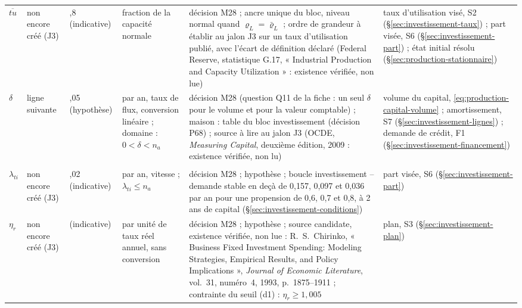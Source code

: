 \documentclass[11pt,a4paper]{article}
\newcommand{\code}[1]{\texttt{\detokenize{#1}}}
\begin{document}
\begin{center}
\begin{longtable}{p{1.5cm}>{\raggedright\arraybackslash}p{3.0cm}>{\raggedright\arraybackslash}p{1.4cm}>{\raggedright\arraybackslash}p{1.8cm}>{\raggedright\arraybackslash}p{3.4cm}>{\raggedright\arraybackslash}p{2.6cm}}
$\overline{\mathit{tu}}$ & non encore créé (J3) & 0,8 (indicative) & fraction de la capacité normale & décision M28 ; ancre unique du bloc, niveau normal quand $\varrho_L = \bar\varrho_L$ ; ordre de grandeur à établir au jalon J3 sur un taux d'utilisation publié, avec l'écart de définition déclaré (Federal Reserve, statistique G.17, « Industrial Production and Capacity Utilization » : existence vérifiée, non lue) & taux d'utilisation visé, S2 (\S\ref{sec:investissement-taux}) ; part visée, S6 (\S\ref{sec:investissement-part}) ; état initial résolu (\S\ref{sec:production-stationnaire})\\
$\delta$ & ligne suivante & 0,05 (hypothèse) & par an, taux de flux, conversion linéaire ; domaine : $0 < \delta < n_a$ & décision M28 (question Q11 de la fiche : un seul $\delta$ pour le volume et pour la valeur comptable) ; maison : table du bloc investissement (décision P68) ; source à lire au jalon J3 (OCDE, \emph{Measuring Capital}, deuxième édition, 2009 : existence vérifiée, non lu) & volume du capital, \eqref{eq:production-capital-volume} ; amortissement, S7 (\S\ref{sec:investissement-lignes}) ; demande de crédit, F1 (\S\ref{sec:investissement-financement})\\
\multicolumn{6}{l}{\quad \code{nations.moteur.parametres.investissement.DELTA}}\\
$\lambda_{\mathit{ti}}$ & non encore créé (J3) & 0,02 (indicative) & par an, vitesse ; $\lambda_{\mathit{ti}} \le n_a$ & décision M28 ; hypothèse ; boucle investissement -- demande stable en deçà de 0,157, 0,097 et 0,036 par an pour une propension de 0,6, 0,7 et 0,8, à 2 ans de capital (\S\ref{sec:investissement-conditions}) & part visée, S6 (\S\ref{sec:investissement-part})\\
$\eta_r$ & non encore créé (J3) & 2 (indicative) & par unité de taux réel annuel, sans conversion & décision M28 ; hypothèse ; source candidate, existence vérifiée, non lue : R.~S.~Chirinko, « Business Fixed Investment Spending: Modeling Strategies, Empirical Results, and Policy Implications », \emph{Journal of Economic Literature}, vol.~31, numéro~4, 1993, p.~1875--1911 ; contrainte du seuil (d1) : $\eta_r \ge 1{,}005$ & plan, S3 (\S\ref{sec:investissement-plan})\\

\end{longtable}
\end{center}
\end{document}
